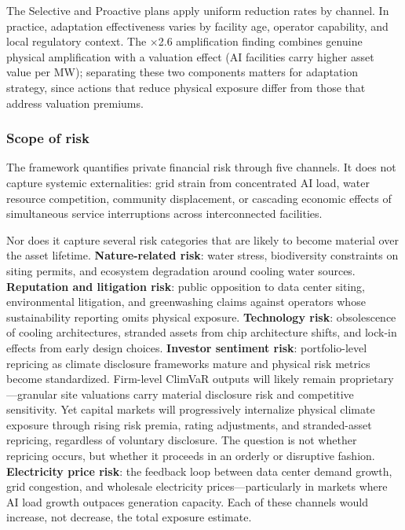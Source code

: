 \begin{twocolbody}
The Selective and Proactive plans apply uniform reduction rates by channel. In practice, adaptation effectiveness varies by facility age, operator capability, and local regulatory context. The $\times$2.6 amplification finding combines genuine physical amplification with a valuation effect (AI facilities carry higher asset value per MW); separating these two components matters for adaptation strategy, since actions that reduce physical exposure differ from those that address valuation premiums.

\subsubsection*{Scope of risk}

The framework quantifies private financial risk through five channels. It does not capture systemic externalities: grid strain from concentrated AI load, water resource competition, community displacement, or cascading economic effects of simultaneous service interruptions across interconnected facilities.

Nor does it capture several risk categories that are likely to become material over the asset lifetime. \textbf{Nature-related risk}: water stress, biodiversity constraints on siting permits, and ecosystem degradation around cooling water sources. \textbf{Reputation and litigation risk}: public opposition to data center siting, environmental litigation, and greenwashing claims against operators whose sustainability reporting omits physical exposure. \textbf{Technology risk}: obsolescence of cooling architectures, stranded assets from chip architecture shifts, and lock-in effects from early design choices. \textbf{Investor sentiment risk}: portfolio-level repricing as climate disclosure frameworks mature and physical risk metrics become standardized. Firm-level ClimVaR outputs will likely remain proprietary---granular site valuations carry material disclosure risk and competitive sensitivity. Yet capital markets will progressively internalize physical climate exposure through rising risk premia, rating adjustments, and stranded-asset repricing, regardless of voluntary disclosure. The question is not whether repricing occurs, but whether it proceeds in an orderly or disruptive fashion. \textbf{Electricity price risk}: the feedback loop between data center demand growth, grid congestion, and wholesale electricity prices---particularly in markets where AI load growth outpaces generation capacity. Each of these channels would increase, not decrease, the total exposure estimate.

\end{twocolbody}

